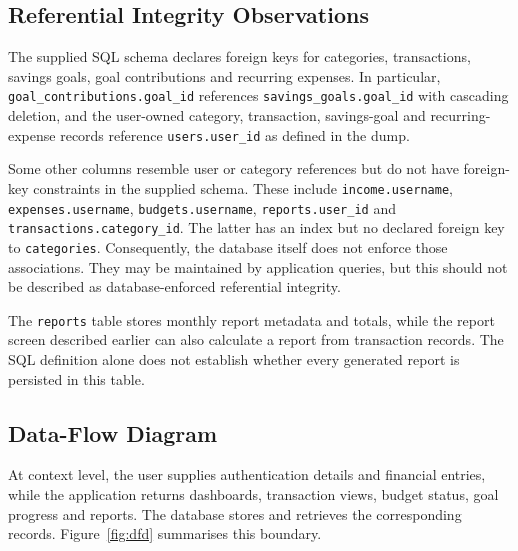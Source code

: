\documentclass{tietreport}
\begin{document}
\subsection{Referential Integrity Observations}

The supplied SQL schema declares foreign keys for categories, transactions,
savings goals, goal contributions and recurring expenses. In particular,
\texttt{goal\_contributions.goal\_id} references
\texttt{savings\_goals.goal\_id} with cascading deletion, and the user-owned
category, transaction, savings-goal and recurring-expense records reference
\texttt{users.user\_id} as defined in the dump.

Some other columns resemble user or category references but do not have
foreign-key constraints in the supplied schema. These include
\texttt{income.username}, \texttt{expenses.username},
\texttt{budgets.username}, \texttt{reports.user\_id} and
\texttt{transactions.category\_id}. The latter has an index but no declared
foreign key to \texttt{categories}. Consequently, the database itself does
not enforce those associations. They may be maintained by application
queries, but this should not be described as database-enforced referential
integrity.

The \texttt{reports} table stores monthly report metadata and totals, while
the report screen described earlier can also calculate a report from
transaction records. The SQL definition alone does not establish whether
every generated report is persisted in this table.
\subsection{Data-Flow Diagram}

At context level, the user supplies authentication details and financial
entries, while the application returns dashboards, transaction views,
budget status, goal progress and reports. The database stores and retrieves
the corresponding records. Figure~\ref{fig:dfd} summarises this boundary.
\end{document}
